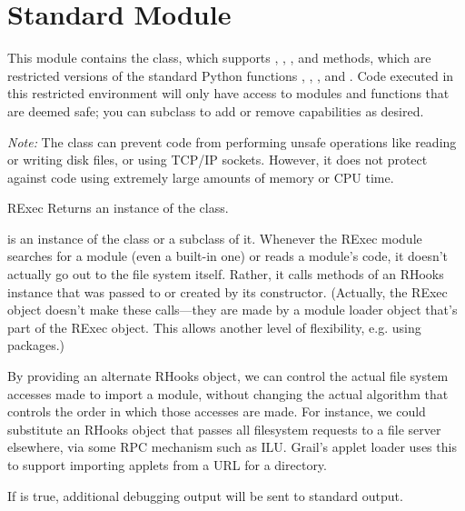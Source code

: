 \section{Standard Module }
\renewcommand{\indexsubitem}{(in module rexec)}

This module contains the  class, which supports
, , , and
 methods, which are restricted versions of the standard
Python functions , , , and
.  Code executed in this restricted environment will
only have access to modules and functions that are deemed safe; you
can subclass  to add or remove capabilities as desired.

\emph{Note:} The  class can prevent code from performing
unsafe operations like reading or writing disk files, or using TCP/IP
sockets.  However, it does not protect against code using extremely
large amounts of memory or CPU time.  

\begin{funcdesc}{RExec}{ }
Returns an instance of the  class.  


 is an instance of the  class or a subclass of it.
Whenever the RExec module searches for a module (even a built-in one)
or reads a module's code, it doesn't actually go out to the file
system itself.  Rather, it calls methods of an RHooks instance that
was passed to or created by its constructor.  (Actually, the RExec
object doesn't make these calls---they are made by a module loader
object that's part of the RExec object.  This allows another level of
flexibility, e.g. using packages.)

By providing an alternate RHooks object, we can control the actual
file system accesses made to import a module, without changing the
actual algorithm that controls the order in which those accesses are
made.  For instance, we could substitute an RHooks object that passes
all filesystem requests to a file server elsewhere, via some RPC
mechanism such as ILU.  Grail's applet loader uses this to support
importing applets from a URL for a directory.

If  is true, additional debugging output will be sent to
standard output.
\end{funcdesc}

